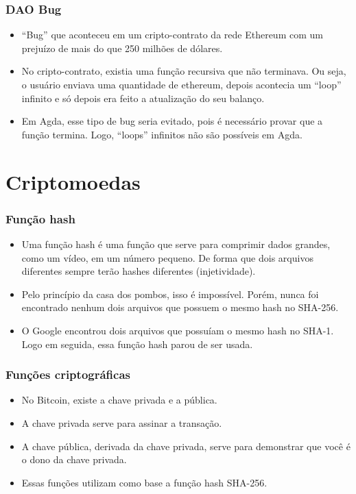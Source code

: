 \documentclass{beamer}
\begin{document}
\begin{frame}
  \frametitle{DAO Bug}
  \begin{itemize}
    \item \foreignquote{english}{Bug} que aconteceu em um cripto-contrato da rede Ethereum com um prejuízo de mais do que 250 milhões de dólares.
      \cite{wood2014ethereum}
    \item No cripto-contrato, existia uma função recursiva que não terminava.
      Ou seja, o usuário enviava uma quantidade de ethereum,
      depois acontecia um \foreignquote{english}{loop} infinito e só depois era feito a atualização do seu balanço.
    \item Em Agda, esse tipo de bug seria evitado, pois é necessário provar que a função termina.
      Logo, \foreignquote{english}{loops} infinitos não são possíveis em Agda.
  \end{itemize}
\end{frame}

\section{Criptomoedas}
\begin{frame}
  \frametitle{Função hash}
  \begin{itemize}
    \item Uma função hash é uma função que serve para comprimir dados grandes, como um vídeo,
      em um número pequeno.
      De forma que dois arquivos diferentes sempre terão hashes diferentes (injetividade).
    \item Pelo princípio da casa dos pombos, isso é impossível.
      Porém, nunca foi encontrado nenhum dois arquivos que possuem o mesmo hash no SHA-256.
    \item O Google encontrou dois arquivos que possuíam o mesmo hash no SHA-1.
      Logo em seguida, essa função hash parou de ser usada.
  \end{itemize}
\end{frame}

\begin{frame}
  \frametitle{Funções criptográficas}
  \begin{itemize}
    \item No Bitcoin, existe a chave privada e a pública.
    \item A chave privada serve para assinar a transação.
    \item A chave pública, derivada da chave privada,
      serve para demonstrar que você é o dono da chave privada.
    \item Essas funções utilizam como base a função hash SHA-256.
  \end{itemize}
\end{frame}
\end{document}
